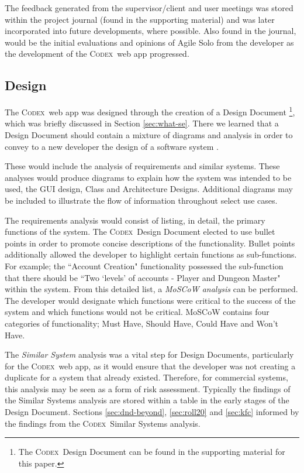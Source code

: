 \documentclass[final]{cmpreport}
\newcommand{\Codex}{\textsc{Codex}}
\begin{document}
		The feedback generated from the supervisor/client and user meetings was stored within the project journal (found in the supporting material) and was later incorporated into future developments, where possible. Also found in the journal, would be the initial evaluations and opinions of Agile Solo from the developer as the development of the \Codex \ web app progressed. 
		
		\subsection{Design} \label{sec:design}
		The \Codex \ web app was designed through the creation of a Design Document \footnote{The \Codex \ Design Document can be found in the supporting material for this paper.}, which was briefly discussed in Section \ref{sec:what-se}. There we learned that a Design Document should contain a mixture of diagrams and analysis in order to convey to a new developer the design of a software system \citep{DesignDocExample}.
		
		These would include the analysis of requirements and similar systems. These analyses would produce diagrams to explain how the system was intended to be used, the GUI design, Class and Architecture Designs. Additional diagrams may be included to illustrate the flow of information throughout select use cases.
		
		The requirements analysis would consist of listing, in detail, the primary functions of the system. The \Codex \ Design Document elected to use bullet points in order to promote concise descriptions of the functionality. Bullet points additionally allowed the developer to highlight certain functions as sub-functions. For example; the ``Account Creation" functionality possessed the sub-function that there should be ``Two `levels' of accounts - Player and Dungeon Master" within the system. From this detailed list, a \emph{MoSCoW analysis} can be performed. The developer would designate which functions were critical to the success of the system and which functions would not be critical. MoSCoW contains four categories of functionality; Must Have, Should Have, Could Have and Won't Have.
		
		The \emph{Similar System} analysis was a vital step for Design Documents, particularly for the \Codex \ web app, as it would ensure that the developer was not creating a duplicate for a system that already existed. Therefore, for commercial systems, this analysis may be seen as a form of risk assessment. Typically the findings of the Similar Systems analysis are stored within a table in the early stages of the Design Document. Sections \ref{sec:dnd-beyond}, \ref{sec:roll20} and \ref{sec:kfc} informed by the findings from the \Codex \ Similar Systems analysis. 
		
\end{document}

